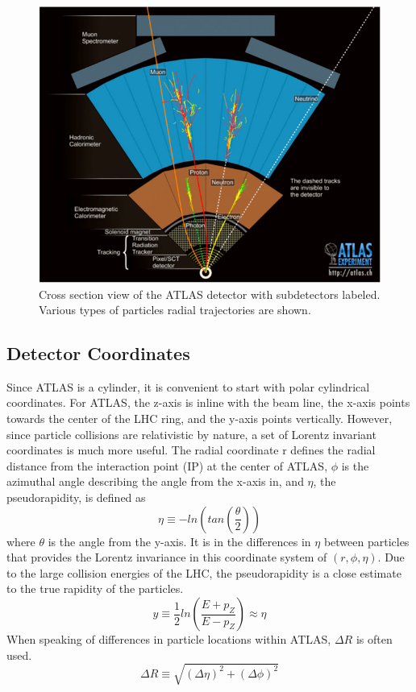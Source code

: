 	\begin{figure}[!ht]
	\centering
	\includegraphics[width=.65\textwidth,keepaspectratio=true]{chapters/chapter2_experiment/images/ATLASCrossSectionDiagram.png}
	\caption{ Cross section view of the ATLAS detector with subdetectors labeled. Various types of particles radial trajectories are shown.}
	\label{fig:ATLAS-XSec}
	\end{figure}

	\subsection{Detector Coordinates}\label{ssec:coordinates}
	Since ATLAS is a cylinder, it is convenient to start with polar cylindrical coordinates. For ATLAS, the z-axis is inline with the beam line, the x-axis points towards the center of the LHC ring, and the y-axis points vertically. However, since particle collisions are relativistic by nature, a set of Lorentz invariant coordinates is much more useful. The radial coordinate r defines the radial distance from the interaction point (IP) at the center of ATLAS, $\phi$ is the azimuthal angle describing the angle from the x-axis in, and $\eta$, the pseudorapidity, is defined as 
	\begin{equation}\label{eqn:eta}
	\eta \equiv - ln(tan(\frac{\theta}{2}))
	\end{equation}
	where $\theta$ is the angle from the y-axis. It is in the differences in $\eta$ between particles that provides the Lorentz invariance in this coordinate system of $(r,\phi,\eta)$. Due to the large collision energies of the LHC, the pseudorapidity is a close estimate to the true rapidity of the particles. 
	\begin{equation}\label{eqn:rapidity}
	y \equiv \frac{1}{2} ln(\frac{E+p_Z}{E-p_Z}) \approx \eta
	\end{equation}
	When speaking of differences in particle locations within ATLAS, $\Delta R$  is often used.
	\begin{equation}\label{eqn:dR}
	\Delta R \equiv \sqrt{ (\Delta \eta)^2 + (\Delta \phi)^2}
	\end{equation}

